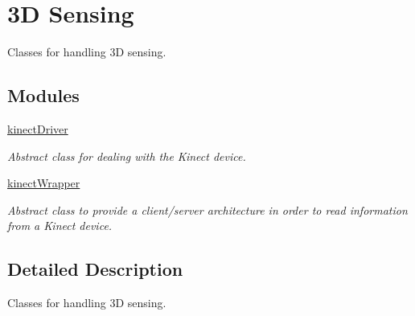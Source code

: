\section{3\+D Sensing}
\label{group__depthSensing}


Classes for handling 3\+D sensing.  


\subsection*{Modules}
\begin{DoxyCompactItemize}
\item 
\hyperlink{group__kinectDriver}{kinect\+Driver}
\begin{DoxyCompactList}\small\item\em Abstract class for dealing with the Kinect device. \end{DoxyCompactList}\item 
\hyperlink{group__kinectWrapper}{kinect\+Wrapper}
\begin{DoxyCompactList}\small\item\em Abstract class to provide a client/server architecture in order to read information from a Kinect device. \end{DoxyCompactList}\end{DoxyCompactItemize}


\subsection{Detailed Description}
Classes for handling 3\+D sensing. 


